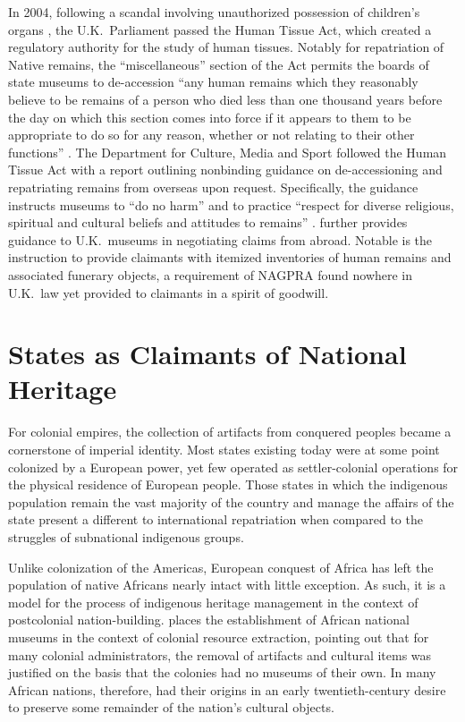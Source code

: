 \documentclass[american]{../../../coursework}
\begin{document}
In 2004, following a scandal involving unauthorized possession of children's
organs \parencite[see][]{Bur02}, the U.K.\ Parliament passed the Human Tissue
Act, which created a regulatory authority for the study of human tissues.
Notably for repatriation of Native remains, the ``miscellaneous'' section of
the Act permits the boards of state museums to de-accession ``any human
remains which they reasonably believe to be remains of a person who died less
than one thousand years before the day on which this section comes into force
if it appears to them to be appropriate to do so for any reason, whether or
not relating to their other functions'' \parencite{Hum04}. The Department for
Culture, Media and Sport followed the Human Tissue Act with a report outlining
nonbinding guidance on de-accessioning and repatriating remains from overseas
upon request. Specifically, the guidance instructs museums to ``do no harm''
and to practice ``respect for diverse religious, spiritual and cultural
beliefs and attitudes to remains'' \parencite[14]{Dep05}. \textcite{Gie09}
further provides guidance to U.K.\ museums in negotiating claims from abroad.
Notable is the instruction to provide claimants with itemized inventories of
human remains and associated funerary objects, a requirement of NAGPRA found
nowhere in U.K.\ law yet provided to claimants in a spirit of goodwill. 

\section{States as Claimants of National Heritage}

For colonial empires, the collection of artifacts from conquered peoples
became a cornerstone of imperial identity. Most states existing today were at
some point colonized by a European power, yet few operated as settler-colonial
operations for the physical residence of European people. Those states in
which the indigenous population remain the vast majority of the country and
manage the affairs of the state present a different to international
repatriation when compared to the struggles of subnational indigenous groups.

Unlike colonization of the Americas, European conquest of Africa has left the
population of native Africans nearly intact with little exception. As such, it
is a model for the process of indigenous heritage management in the context of
postcolonial nation-building. \textcite{Shy09} places the establishment of
African national museums in the context of colonial resource extraction,
pointing out that for many colonial administrators, the removal of artifacts
and cultural items was justified on the basis that the colonies had no museums
of their own. In many African nations, therefore, had their origins in an
early twentieth-century desire to preserve some remainder of the nation's
cultural objects.
\end{document}
